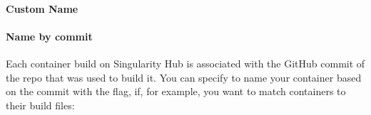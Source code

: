 \documentclass[letterpaper,10pt,english]{sphinxmanual}
\begin{document}
\paragraph{Custom Name}
\label{\detokenize{appendix:custom-name}}
%
\begin{sphinxVerbatim}[commandchars=\\\{\}]
    

  

    
\end{sphinxVerbatim}


\paragraph{Name by commit}
\label{\detokenize{appendix:name-by-commit}}
Each container build on Singularity Hub is associated with the GitHub
commit of the repo that was used to build it. You can specify to name
your container based on the commit with the  flag, if, for example, you
want to match containers to their build files:

%
\begin{sphinxVerbatim}[commandchars=\\\{\}]
   

  

    
\end{sphinxVerbatim}
\end{document}
